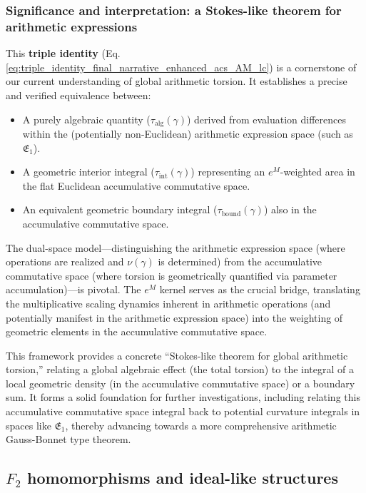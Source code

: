 \subsubsection*{Significance and interpretation: a Stokes-like theorem for arithmetic expressions}

This \textbf{triple identity} (Eq. \ref{eq:triple_identity_final_narrative_enhanced_acs_AM_lc}) is a cornerstone of our current understanding of global arithmetic torsion. It establishes a precise and verified equivalence between:
\begin{itemize}
    \item A purely algebraic quantity ($\tau_{\text{alg}}(\gamma)$) derived from evaluation differences within the (potentially non-Euclidean) arithmetic expression space (such as $\mathfrak{E}_1$).
    \item A geometric interior integral ($\tau_{\text{int}}(\gamma)$) representing an $e^M$-weighted area in the flat Euclidean accumulative commutative space.
    \item An equivalent geometric boundary integral ($\tau_{\text{bound}}(\gamma)$) also in the accumulative commutative space.
\end{itemize}
The dual-space model---distinguishing the arithmetic expression space (where operations are realized and $\nu(\gamma)$ is determined) from the accumulative commutative space (where torsion is geometrically quantified via parameter accumulation)---is pivotal. The $e^M$ kernel serves as the crucial bridge, translating the multiplicative scaling dynamics inherent in arithmetic operations (and potentially manifest in the arithmetic expression space) into the weighting of geometric elements in the accumulative commutative space.

This framework provides a concrete ``Stokes-like theorem for global arithmetic torsion,'' relating a global algebraic effect (the total torsion) to the integral of a local geometric density (in the accumulative commutative space) or a boundary sum. It forms a solid foundation for further investigations, including relating this accumulative commutative space integral back to potential curvature integrals in spaces like $\mathfrak{E}_1$, thereby advancing towards a more comprehensive arithmetic Gauss-Bonnet type theorem.

\subsection{$F_2$ homomorphisms and ideal-like structures}
\label{sec:acs_algebraic_significance_revised_AM_lc}

